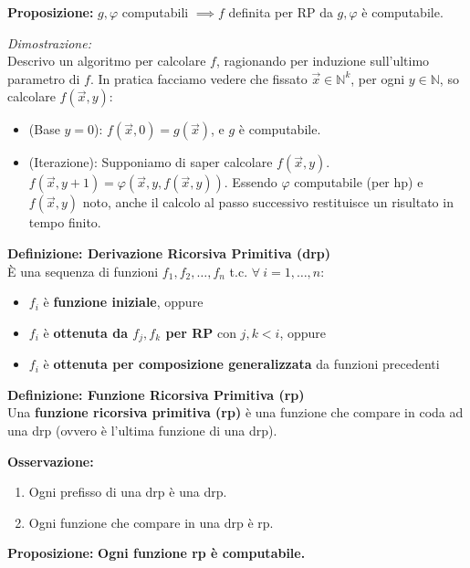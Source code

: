 \vspace{0.4cm}
\textbf{Proposizione:} $g, \varphi$ computabili $\implies f$ definita per RP da $g, \varphi$ è computabile.

\textit{Dimostrazione:} \\
Descrivo un algoritmo per calcolare $f$, ragionando per induzione sull'ultimo parametro di $f$. In pratica facciamo vedere che fissato $\vec{x} \in \mathbb{N}^k$, per ogni $y \in \mathbb{N}$, so calcolare $f(\vec{x}, y)$:
\begin{itemize}
    \item (Base $y=0$): $f(\vec{x}, 0) = g(\vec{x})$, e $g$ è computabile.
    \item (Iterazione): Supponiamo di saper calcolare $f(\vec{x}, y)$. \\
    $f(\vec{x}, y+1) = \varphi(\vec{x}, y, f(\vec{x}, y))$. Essendo $\varphi$ computabile (per hp) e $f(\vec{x},y)$ noto, anche il calcolo al passo successivo restituisce un risultato in tempo finito.
\end{itemize}

\vspace{0.4cm}
\textbf{Definizione: Derivazione Ricorsiva Primitiva (drp)} \\
È una sequenza di funzioni $f_1, f_2, \dots, f_n$ t.c. $\forall\ i = 1, \dots, n$:
\begin{itemize}
    \item $f_i$ è \textbf{funzione iniziale}, oppure
    \item $f_i$ è \textbf{ottenuta da $f_j, f_k$ per RP} con $j, k < i$, oppure
    \item $f_i$ è \textbf{ottenuta per composizione generalizzata} da funzioni precedenti 
\end{itemize}

\vspace{0.4cm}
\textbf{Definizione: Funzione Ricorsiva Primitiva (rp)} \\
Una \textbf{funzione ricorsiva primitiva (rp)} è una funzione che compare in coda ad una drp (ovvero è l'ultima funzione di una drp).

\newpage
\textbf{Osservazione:}
\begin{enumerate}
    \item Ogni prefisso di una drp è una drp.
    \item Ogni funzione che compare in una drp è rp.
\end{enumerate}

\vspace{0.4cm}
\textbf{Proposizione:} \textbf{Ogni funzione rp è computabile.}

